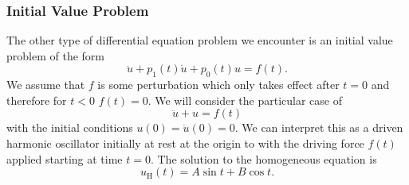 \documentclass[fleqn]{NotesClass}
\begin{document}
    \subsubsection{Initial Value Problem}
    The other type of differential equation problem we encounter is an initial value problem of the form
    \begin{equation}
        \ddot{u} + p_1(t)\dot{u} + p_0(t)u = f(t).
    \end{equation}
    We assume that \(f\) is some perturbation which only takes effect after \(t = 0\) and therefore for \(t < 0\) \(f(t) = 0\).
    We will consider the particular case of 
    \begin{equation}
        \ddot{u} + u = f(t)
    \end{equation}
    with the initial conditions \(u(0) = \dot{u}(0) = 0\).
    We can interpret this as a driven harmonic oscillator initially at rest at the origin to with the driving force \(f(t)\) applied starting at time \(t = 0\).
    The solution to the homogeneous equation is
    \begin{equation}
        u_{\mathrm{H}}(t) = A\sin t + B \cos t.
    \end{equation}
\end{document}
